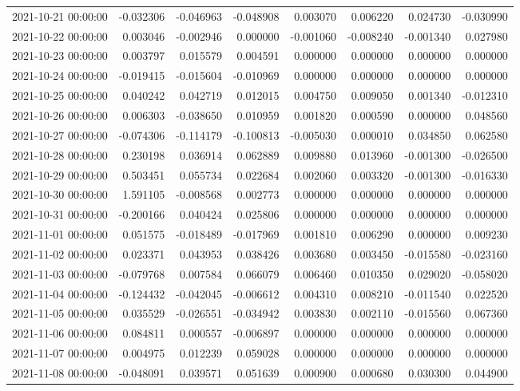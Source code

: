 \begin{tabular}{lrrrrrrr}
2021-10-21 00:00:00 & -0.032306 & -0.046963 & -0.048908 & 0.003070 & 0.006220 & 0.024730 & -0.030990 \\
2021-10-22 00:00:00 & 0.003046 & -0.002946 & 0.000000 & -0.001060 & -0.008240 & -0.001340 & 0.027980 \\
2021-10-23 00:00:00 & 0.003797 & 0.015579 & 0.004591 & 0.000000 & 0.000000 & 0.000000 & 0.000000 \\
2021-10-24 00:00:00 & -0.019415 & -0.015604 & -0.010969 & 0.000000 & 0.000000 & 0.000000 & 0.000000 \\
2021-10-25 00:00:00 & 0.040242 & 0.042719 & 0.012015 & 0.004750 & 0.009050 & 0.001340 & -0.012310 \\
2021-10-26 00:00:00 & 0.006303 & -0.038650 & 0.010959 & 0.001820 & 0.000590 & 0.000000 & 0.048560 \\
2021-10-27 00:00:00 & -0.074306 & -0.114179 & -0.100813 & -0.005030 & 0.000010 & 0.034850 & 0.062580 \\
2021-10-28 00:00:00 & 0.230198 & 0.036914 & 0.062889 & 0.009880 & 0.013960 & -0.001300 & -0.026500 \\
2021-10-29 00:00:00 & 0.503451 & 0.055734 & 0.022684 & 0.002060 & 0.003320 & -0.001300 & -0.016330 \\
2021-10-30 00:00:00 & 1.591105 & -0.008568 & 0.002773 & 0.000000 & 0.000000 & 0.000000 & 0.000000 \\
2021-10-31 00:00:00 & -0.200166 & 0.040424 & 0.025806 & 0.000000 & 0.000000 & 0.000000 & 0.000000 \\
2021-11-01 00:00:00 & 0.051575 & -0.018489 & -0.017969 & 0.001810 & 0.006290 & 0.000000 & 0.009230 \\
2021-11-02 00:00:00 & 0.023371 & 0.043953 & 0.038426 & 0.003680 & 0.003450 & -0.015580 & -0.023160 \\
2021-11-03 00:00:00 & -0.079768 & 0.007584 & 0.066079 & 0.006460 & 0.010350 & 0.029020 & -0.058020 \\
2021-11-04 00:00:00 & -0.124432 & -0.042045 & -0.006612 & 0.004310 & 0.008210 & -0.011540 & 0.022520 \\
2021-11-05 00:00:00 & 0.035529 & -0.026551 & -0.034942 & 0.003830 & 0.002110 & -0.015560 & 0.067360 \\
2021-11-06 00:00:00 & 0.084811 & 0.000557 & -0.006897 & 0.000000 & 0.000000 & 0.000000 & 0.000000 \\
2021-11-07 00:00:00 & 0.004975 & 0.012239 & 0.059028 & 0.000000 & 0.000000 & 0.000000 & 0.000000 \\
2021-11-08 00:00:00 & -0.048091 & 0.039571 & 0.051639 & 0.000900 & 0.000680 & 0.030300 & 0.044900 \\

\end{tabular}
